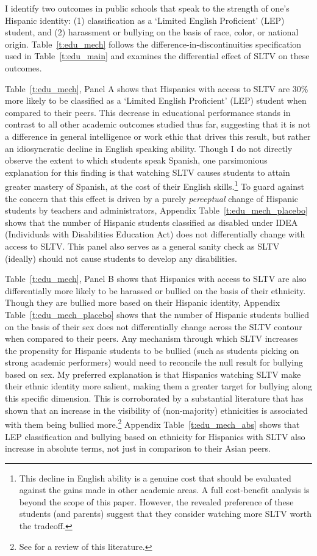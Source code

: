 \documentclass[11pt]{article}
\begin{document}
I identify two outcomes in public schools that speak to the strength of one's Hispanic identity: (1) classification as a `Limited English Proficient' (LEP) student, and (2) harassment or bullying on the basis of race, color, or national origin. Table~\ref{t:edu_mech} follows the difference-in-discontinuities specification used in Table~\ref{t:edu_main} and examines the differential effect of SLTV on these outcomes.

Table~\ref{t:edu_mech}, Panel A shows that Hispanics with access to SLTV are 30\% more likely to be classified as a  `Limited English Proficient' (LEP) student when compared to their peers. This decrease in educational performance stands in contrast to all other academic outcomes studied thus far, suggesting that it is not a difference in general intelligence or work ethic that drives this result, but rather an idiosyncratic decline in English speaking ability. Though I do not directly observe the extent to which students speak Spanish, one parsimonious explanation for this finding is that watching SLTV causes students to attain greater mastery of Spanish, at the cost of their English skills.\footnote{ This decline in English ability is a genuine cost that should be evaluated against the gains made in other academic areas. A full cost-benefit analysis is beyond the scope of this paper. However, the revealed preference of these students (and parents) suggest that they consider watching more SLTV worth the tradeoff.} To guard against the concern that this effect is driven by a purely \textit{perceptual} change of Hispanic students by teachers and administrators, Appendix Table~\ref{t:edu_mech_placebo} shows that the number of Hispanic students classified as disabled under IDEA (Individuals with Disabilities Education Act) does not differentially change with access to SLTV. This panel also serves as a general sanity check as SLTV (ideally) should not cause students to develop any disabilities. 

Table~\ref{t:edu_mech}, Panel B shows that Hispanics with access to SLTV are also differentially more likely to be harassed or bullied on the basis of their ethnicity. Though they are bullied more based on their Hispanic identity, Appendix Table~\ref{t:edu_mech_placebo} shows that the number of Hispanic students bullied on the basis of their sex does not differentially change across the SLTV contour when compared to their peers. Any mechanism through which SLTV increases the propensity for Hispanic students to be bullied (such as students picking on strong academic performers) would need to reconcile the null result for bullying based on sex. My preferred explanation is that Hispanics watching SLTV make their ethnic identity more salient, making them a greater target for bullying along this specific dimension. This is corroborated by a substantial literature that has shown that an increase in the visibility of (non-majority) ethnicities is associated with them being bullied more.\footnote{ See \cite{scherr_bullying_2009} for a review of this literature.} Appendix Table~\ref{t:edu_mech_abs} shows that LEP classification and bullying based on ethnicity for Hispanics with SLTV also increase in absolute terms, not just in comparison to their Asian peers. 
\end{document}
